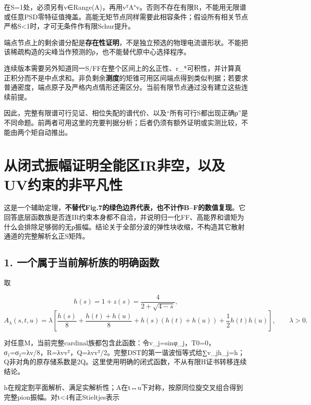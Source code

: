 \documentclass[
  10pt,
  a4paper,
]{article}
\begin{document}
在\textbar S\textbar=1处，必须另有v∈Range(A)，再用vᵀA⁺v。否则不存在有限R，不能用无限谱或任意PSD零特征值掩盖。高能无矩节点同样需要此相容条件；假设所有相关节点严格\textbar S\textbar\textless1时，才可无条件作有限Schur提升。

端点节点上的剩余谱分配是\textbf{存在性证明}，不是独立预选的物理电流谱形状。不能把该稀疏构造的尖峰当作预测的ρ，也不能替代原中心选择程序。

连续版本需要另外知道同一S/FF在整个区间上的幺正性、r\_*可积性，并计算真正积分而不是中点求和。非负剩余\textbf{测度}的矩锥可用区间端点得到类似判据；若要求普通密度，端点原子及严格内点情形还需区分。当前有限节点通过没有建立这些连续前提。

因此，完整有限谱可行见证、相位失配的谱代价、以及``所有可行S都出现正确ρ''是不同命题。前两者可用这里的充要判据分析；后者仍须有额外证明或实测比较，不能由两个矩自动推出。

\newpage

\section{从闭式振幅证明全能区IR非空，以及UV约束的非平凡性}\label{ux4eceux95edux5f0fux632fux5e45ux8bc1ux660eux5168ux80fdux533airux975eux7a7aux4ee5ux53cauvux7ea6ux675fux7684ux975eux5e73ux51e1ux6027}

这是一个辅助定理，\textbf{不替代Fig.7的绿色边界代表，也不计作B--F的数值复现}。它回答底层函数族是否连IR约束本身都不自洽，并说明归一化FF、高能界和谱矩为什么会排除足够弱的无ρ振幅。结论关于全部分波的弹性块收缩，不构造其它散射通道的完整解析幺正S矩阵。

\subsection{1.
一个属于当前解析族的明确函数}\label{ux4e00ux4e2aux5c5eux4e8eux5f53ux524dux89e3ux6790ux65cfux7684ux660eux786eux51fdux6570}

取

\[
h(s)=1+z(s)=\frac4{2+\sqrt{4-s}},
\] \[
A_\lambda(s,t,u)=\lambda\left[
\frac{h(s)}8+\frac{h(t)+h(u)}8+
h(s)(h(t)+h(u))+\frac12h(t)h(u)\right],\qquad\lambda>0.
\]

对任意M，当前完整cardinal族都包含此函数：令v\_j=sinφ\_j，T0=0，σ₁=σ₂=λv/8，R=λvvᵀ，Q=λvvᵀ/2。完整DST的第一谐波恒等式给∑v\_jh\_j=h；Q非对角的原存储系数是2Q。这里使用明确的闭式函数，不从有限H证书转移连续结论。

h在规定割平面解析、满足实解析性；A在t↔u下对称，按原同位旋交叉组合得到完整pion振幅。对t\textless4有正Stieltjes表示
\end{document}
